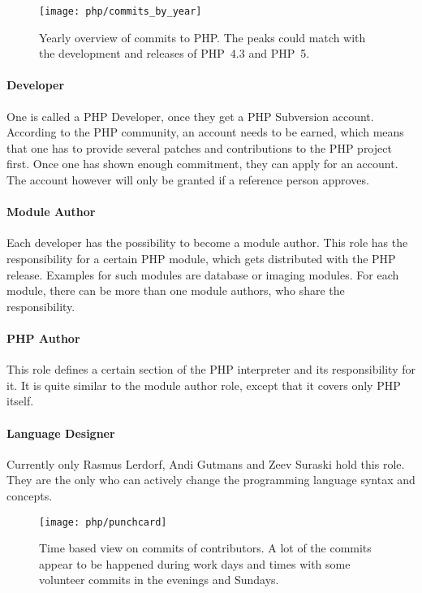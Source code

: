 \begin{figure}[htbp]
  \centering
  \texttt{[image: php/commits\_by\_year]}
  \caption[Commits by Year, PHP]
  {Yearly overview of commits to PHP. The peaks could match with the
    development and releases of PHP~4.3 and PHP~5.}
\end{figure}

\paragraph{Developer}

One is called a PHP Developer, once they get a PHP Subversion account.
According to the PHP community, an account needs to be earned, which means that
one has to provide several patches and contributions to the PHP project first.
Once one has shown enough commitment, they can apply for an account. The
account however will only be granted if a reference person approves.

\paragraph{Module Author}

Each developer has the possibility to become a module author. This role has the
responsibility for a certain PHP module, which gets distributed with the PHP
release. Examples for such modules are database or imaging modules. For each
module, there can be more than one module authors, who share the
responsibility.

\paragraph{PHP Author}

This role defines a certain section of the PHP interpreter and its
responsibility for it. It is quite similar to the module author role, except
that it covers only PHP itself.

\paragraph{Language Designer}

Currently only Rasmus Lerdorf, Andi Gutmans and Zeev Suraski hold this role.
They are the only who can actively change the programming language syntax and
concepts.

\begin{figure}[hbtp]
  \centering
  \texttt{[image: php/punchcard]}
  \caption[Time Based View on Commits, PHP]
  {Time based view on commits of contributors. A lot of the commits appear to
    be happened during work days and times with some volunteer commits in the
    evenings and Sundays.}
\end{figure}

